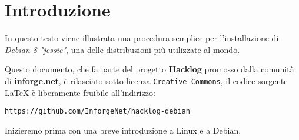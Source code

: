 \chapter{Introduzione}
In questo testo viene illustrata una procedura semplice per l'installazione di \textit{Debian 8 "jessie"}, una delle distribuzioni più utilizzate al mondo.

Questo documento, che fa parte del progetto \textbf{Hacklog} promosso dalla comunità di \textbf{inforge.net}, è rilasciato sotto licenza \texttt{Creative Commons}, il codice sorgente \LaTeX{} è liberamente fruibile all'indirizzo:

\begin{graybox}
	\texttt{https://github.com/InforgeNet/hacklog-debian}
\end{graybox}

Inizieremo prima con una breve introduzione a Linux e a Debian.



